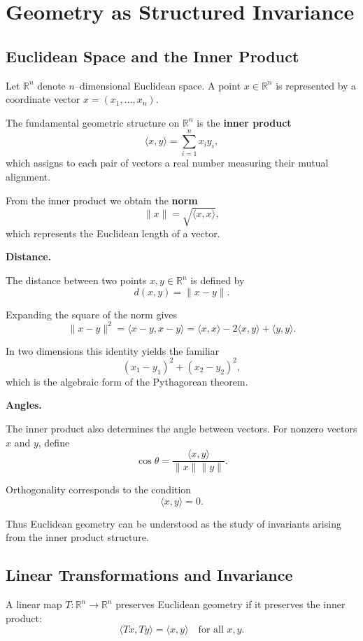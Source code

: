 \documentclass[11pt, openany]{book}
\theoremstyle{plain}
\theoremstyle{definition}
\theoremstyle{remark}
\begin{document}
\chapter{Geometry as Structured Invariance}

\section{Euclidean Space and the Inner Product}

Let $\mathbb{R}^n$ denote $n$–dimensional Euclidean space.  A point
$x\in\mathbb{R}^n$ is represented by a coordinate vector
$x=(x_1,\dots,x_n)$.

The fundamental geometric structure on $\mathbb{R}^n$ is the
\textbf{inner product}
\[
\langle x,y\rangle=\sum_{i=1}^{n} x_i y_i ,
\]
which assigns to each pair of vectors a real number measuring their
mutual alignment.

From the inner product we obtain the \textbf{norm}
\[
\|x\|=\sqrt{\langle x,x\rangle},
\]
which represents the Euclidean length of a vector.

\medskip

\textbf{Distance.}

The distance between two points $x,y\in\mathbb{R}^n$ is defined by
\[
d(x,y)=\|x-y\|.
\]

Expanding the square of the norm gives
\[
\|x-y\|^2
=\langle x-y,x-y\rangle
=\langle x,x\rangle
-2\langle x,y\rangle
+\langle y,y\rangle .
\]

In two dimensions this identity yields the familiar
\[
(x_1-y_1)^2+(x_2-y_2)^2,
\]
which is the algebraic form of the Pythagorean theorem.

\medskip

\textbf{Angles.}

The inner product also determines the angle between vectors.  For
nonzero vectors $x$ and $y$, define
\[
\cos\theta=\frac{\langle x,y\rangle}{\|x\|\|y\|}.
\]

Orthogonality corresponds to the condition
\[
\langle x,y\rangle=0 .
\]

Thus Euclidean geometry can be understood as the study of invariants
arising from the inner product structure.

\section{Linear Transformations and Invariance}

A linear map $T:\mathbb{R}^n\to\mathbb{R}^n$ preserves Euclidean
geometry if it preserves the inner product:
\[
\langle Tx,Ty\rangle=\langle x,y\rangle
\quad\text{for all }x,y.
\]
\end{document}
